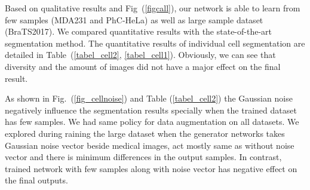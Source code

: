 \documentclass[10pt,twocolumn,letterpaper]{article}
\begin{document}
Based on qualitative results and Fig~(\ref{figcall}), our network is able to learn from few samples (MDA231 and PhC-HeLa) as well as large sample dataset (BraTS2017). We compared quantitative results with the state-of-the-art segmentation method. The quantitative results of individual cell segmentation are detailed in Table~(\ref{tabel_cell2}, \ref{tabel_cell1}). Obviously, we can see that diversity and the amount of images did not have a major effect on the final result.

As shown in Fig.~(\ref{fig_cellnoise}) and Table (\ref{tabel_cell2}) the Gaussian noise negatively influence the segmentation results specially when the trained dataset has few samples.
We had same policy for data augmentation on all datasets.
We explored during raining the large dataset when the generator networks takes Gaussian noise vector beside medical images, act mostly same as without noise vector and there is minimum differences in the output samples. In contrast, trained network with few samples along with noise vector has negative effect on the final outputs.
\end{document}
